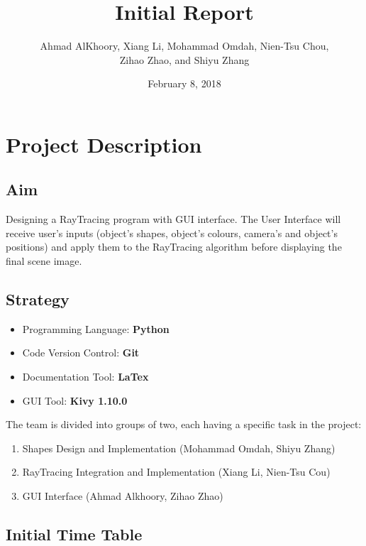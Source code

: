 \documentclass{article}
\title{Initial Report}
\author{Ahmad AlKhoory, Xiang Li, Mohammad Omdah, Nien-Tsu Chou, \\ Zihao Zhao, and Shiyu Zhang}
\date{February 8, 2018}
\begin{document}
\maketitle

\section{Project Description}
\subsection{Aim}

Designing a RayTracing program with GUI interface. The User Interface will receive user's inputs (object's shapes, object's colours, camera's and object's positions) and apply them to the RayTracing algorithm before displaying the final scene image.

\subsection{Strategy}


\begin{itemize}
\item Programming Language: \textbf{Python}
\item Code Version Control: \textbf{Git}
\item Documentation Tool: \textbf{LaTex}
\item GUI Tool: \textbf{Kivy 1.10.0} \\
\end{itemize}

\noindent The team is divided into groups of two, each having a specific task in the project:
\begin{enumerate}
\item Shapes Design and Implementation (Mohammad Omdah, Shiyu Zhang)
\item RayTracing Integration and Implementation (Xiang Li, Nien-Tsu Cou)
\item GUI Interface (Ahmad Alkhoory, Zihao Zhao)
\end{enumerate}


\subsection{Initial Time Table}
\end{document}
